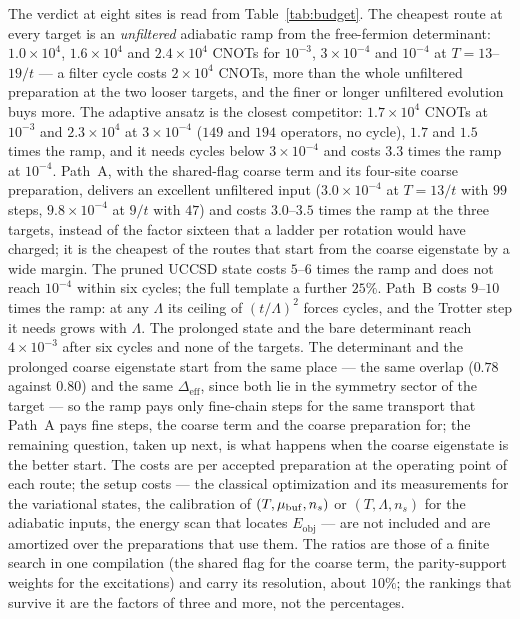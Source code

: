\documentclass[a4paper,11pt,noarxiv]{quantumarticle}
\newcommand{\Eobj}{E_{\mathrm{obj}}}
\newcommand{\Deff}{\Delta_{\mathrm{eff}}}
\begin{document}
The verdict at eight sites is read from Table~\ref{tab:budget}.  The
cheapest route at every target is an \emph{unfiltered} adiabatic ramp from
the free-fermion determinant: $1.0\times10^4$, $1.6\times10^4$ and
$2.4\times10^4$ CNOTs for $10^{-3}$, $3\times10^{-4}$ and $10^{-4}$ at
$T=13$--$19/t$ --- a filter cycle costs $2\times10^4$ CNOTs, more than the
whole unfiltered preparation at the two looser targets, and the finer or
longer unfiltered evolution buys more.  The adaptive ansatz is the closest
competitor: $1.7\times10^4$ CNOTs at $10^{-3}$ and $2.3\times10^4$ at
$3\times10^{-4}$ ($149$ and $194$ operators, no cycle), $1.7$ and $1.5$
times the ramp, and it needs cycles below $3\times10^{-4}$ and costs
$3.3$ times the ramp at $10^{-4}$.  Path~A, with the shared-flag coarse
term and its four-site coarse preparation, delivers an excellent
unfiltered input ($3.0\times10^{-4}$ at $T=13/t$ with $99$ steps,
$9.8\times10^{-4}$ at $9/t$ with $47$) and costs $3.0$--$3.5$ times the
ramp at the three targets, instead of the factor sixteen that a ladder
per rotation would have charged; it is the cheapest of the routes that
start from the coarse eigenstate by a wide margin.  The pruned UCCSD state
costs $5$--$6$ times the ramp and does not reach $10^{-4}$ within six
cycles; the full template a further $25\%$.  Path~B costs $9$--$10$ times the
ramp: at any $\Lambda$ its ceiling of $(t/\Lambda)^2$ forces cycles, and
the Trotter step it needs grows with $\Lambda$.  The prolonged state and
the bare determinant reach $4\times10^{-3}$ after six cycles and none of
the targets.  The determinant and the prolonged coarse eigenstate start
from the same place --- the same overlap ($0.78$ against $0.80$) and the
same $\Deff$, since both lie in the symmetry sector of the target --- so
the ramp pays only fine-chain steps for the same transport that Path~A
pays fine steps, the coarse term and the coarse preparation for; the
remaining question, taken up next, is what happens when the coarse
eigenstate is the better start.  The costs are per accepted preparation
at the operating point of each route; the setup costs --- the classical
optimization and its measurements for the variational states, the
calibration of $(T,\mu_{\rm buf},n_s)$ or $(T,\Lambda,n_s)$ for the
adiabatic inputs, the energy scan that locates $\Eobj$ --- are not
included and are amortized over the preparations that use them.  The
ratios are those of a finite search in one compilation (the shared flag
for the coarse term, the parity-support weights for the excitations) and
carry its resolution, about $10\%$; the rankings that survive it are the
factors of three and more, not the percentages.
\end{document}
